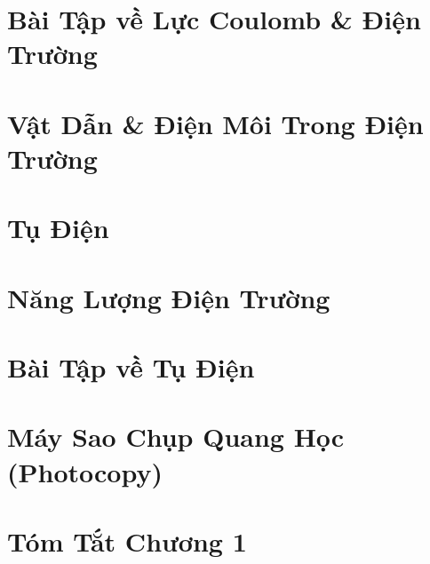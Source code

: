 \documentclass[oneside]{book}
\numberwithin{equation}{section}
\begin{document}

\section{Bài Tập về Lực Coulomb \& Điện Trường}


\section{Vật Dẫn \& Điện Môi Trong Điện Trường}


\section{Tụ Điện}


\section{Năng Lượng Điện Trường}


\section{Bài Tập về Tụ Điện}


\section{Máy Sao Chụp Quang Học (Photocopy)}


\section{Tóm Tắt Chương 1}

\end{document}
